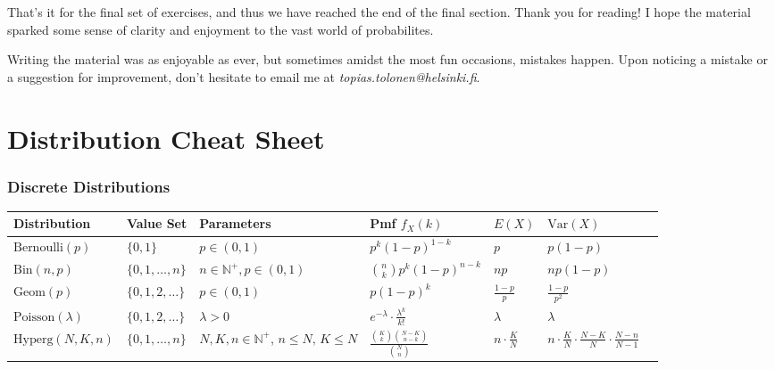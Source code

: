 \documentclass[12pt,a4paper,leqno]{report}
\newcommand{\N}{\mathbb{N}}
\newcommand{\var}{\mathrm{Var}}
\theoremstyle{plain}
\theoremstyle{definition}
\begin{document}
\bigskip
\bigskip
\bigskip
\bigskip

That's it for the final set of exercises, and thus we have reached the end of the final section. Thank you for reading! I hope the material sparked some sense of clarity and enjoyment to the vast world of probabilites.

\bigskip

Writing the material was as enjoyable as ever, but sometimes amidst the most fun occasions, mistakes happen. Upon noticing a mistake or a suggestion for improvement, don't hesitate to email me at \emph{topias.tolonen@helsinki.fi}.

\printbibliography

\appendix
\chapter{Distribution Cheat Sheet}

\subsection*{Discrete Distributions}
\begin{tabular}{ l l L{90pt} l l l l}
\toprule
Distribution & Value Set & Parameters & Pmf $f_X(k)$ & $E(X)$ & $\var(X)$\\
\midrule
$\text{Bernoulli}(p)$ & $\{0,1\}$ & $p \in (0,1)$ & $p^k(1-p)^{1-k}$ & $p$ & $p(1-p)$\\\addlinespace[5pt]
$\text{Bin}(n,p)$ & $\{0,1, \dots, n\}$ & $n\in \N^+, p \in (0,1)$ & $\binom{n}{k} p^k(1-p)^{n-k}$ & $np$ & $np(1-p)$\\\addlinespace[5pt]
$\text{Geom}(p)$ & $\{0,1,2, \dots\}$ & $p \in (0,1)$ & $p(1-p)^k$ & $\frac{1-p}{p}$ & $\frac{1-p}{p^2}$\\\addlinespace[5pt]
$\text{Poisson}(\lambda)$ & $\{0,1,2, \dots\}$ & $\lambda > 0$ & $e^{-\lambda} \cdot \frac{\lambda^k}{k!}$ & $\lambda$ & $\lambda$\\ \addlinespace[5pt]
$\text{Hyperg}(N,K,n)$ & $\{0,1, \dots , n\}$ & $N,K,n \in\N^+$,   $n\leq N, \, K \leq N$ & $\frac{\binom{K}{k}\binom{N-K}{n-k}}{\binom{N}{n}}$ & $n\cdot\frac{K}{N}$ & $n\cdot\frac{K}{N}\cdot\frac{N-K}{N}\cdot\frac{N-n}{N-1}$\\
\bottomrule 
\end{tabular}

\bigskip
\end{document}
